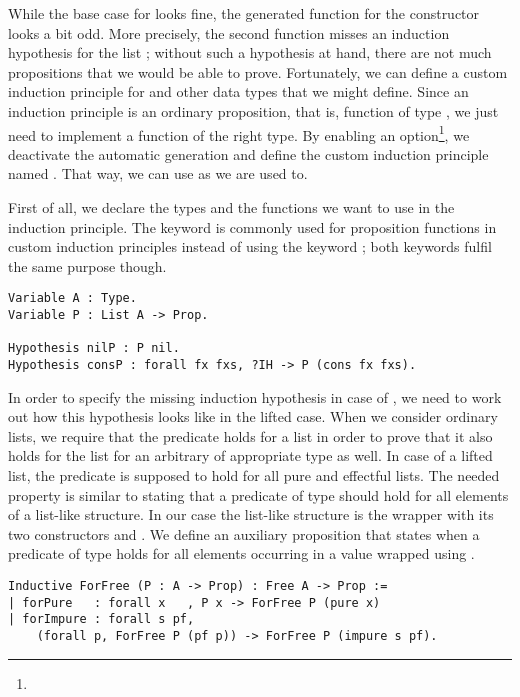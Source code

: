 While the base case for  looks fine, the generated function for the  constructor looks a bit odd.
More precisely, the second function misses an induction hypothesis for the list ; without such a hypothesis at hand, there are not much propositions that we would be able to prove.
Fortunately, we can define a custom induction principle for  and other data types that we might define.
Since an induction principle is an ordinary proposition, that is, function of type , we just need to implement a function of the right type.
By enabling an option\footnote{}, we deactivate the automatic generation and define the custom induction principle named .
That way, we can use  as we are used to.

First of all, we declare the types and the functions we want to use in the induction principle.
The keyword  is commonly used for proposition functions in custom induction principles instead of using the keyword ; both keywords fulfil the same purpose though.

\begin{verbatim}
Variable A : Type.
Variable P : List A -> Prop.

Hypothesis nilP : P nil.
Hypothesis consP : forall fx fxs, ?IH -> P (cons fx fxs).
\end{verbatim}

In order to specify the missing induction hypothesis in case of , we need to work out how this hypothesis looks like in the lifted case.
When we consider ordinary lists, we require that the predicate holds for a list  in order to prove that it also holds for the list  for an arbitrary  of appropriate type as well.
In case of a lifted list, the predicate is supposed to hold for all
pure and effectful lists.
The needed property is similar to stating that a predicate of type  should hold for all elements of a list-like structure.
In our case the list-like structure is the  wrapper with its two constructors  and .
We define an auxiliary proposition  that states when a predicate of type  holds for all elements occurring in a value wrapped using .

\begin{verbatim}
Inductive ForFree (P : A -> Prop) : Free A -> Prop :=
| forPure   : forall x   , P x -> ForFree P (pure x)
| forImpure : forall s pf,
    (forall p, ForFree P (pf p)) -> ForFree P (impure s pf).
\end{verbatim}

